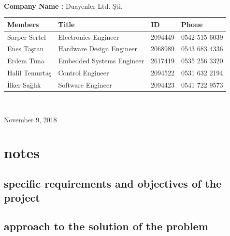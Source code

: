 \documentclass[a4paper,12pt]{article}
\begin{document}
\begin{titlepage}
\begin{minipage}[r]{0.35\textwidth}
\end{minipage}\\[1cm]
\begin{minipage}{\textwidth}
	\begin{flushleft}
		\large{\textbf{Company Name :}}	Duayenler Ltd. Şti.\\
		\begin{table}[H]
			\begin{tabular}{l l l l}
				\hline
				\textbf{Members}&\textbf{Title}& \textbf{ID}&\textbf{Phone} \\ \hline
				Sarper Sertel & Electronics Engineer& 2094449 & 0542 515 6039  \\ 
				Enes Taştan & Hardware Design Engineer & 2068989 & 0543 683 4336  \\ 
				Erdem Tuna & Embedded Systems Engineer& 2617419 & 0535 256 3320  \\ 
				Halil Temurtaş & Control Engineer& 2094522 & 0531 632 2194  \\
				İlker Sağlık & Software Engineer& 2094423 & 0541 722 9573  \\ \hline
				
				
			\end{tabular}
		\end{table}
	\end{flushleft}
\end{minipage}\\[1cm]

\begin{flushbottom}
{\large November 9, 2018} %
\end{flushbottom}

\end{titlepage}

\blankpage
\tableofcontents
\newpage



	\section{notes}


\subsection{specific requirements and objectives of the project}


\subsection{approach to the solution of the problem}
\end{document}
